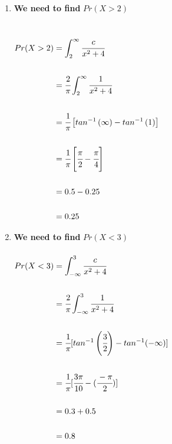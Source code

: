 \documentclass{article}
\begin{document}
\begin{enumerate}
\begin{enumerate}
\newpage
\item\large
\textbf{We need to find} $Pr(X > 2)$\\\\\\
$\begin{aligned}
Pr(X > 2) &= \int_{2}^{\infty} \cfrac{c}{x^2+4}\\\\
&= \cfrac{2}{\pi} \int_{2}^{\infty} \cfrac{1}{x^2+4}\\\\
&= \cfrac{1}{\pi} \left[  tan^{-1} \left( {\infty} \right) - tan^{-1} \left( {1} \right) \right]\\\\
&= \cfrac{1}{\pi} \left[ \cfrac{\pi}{2} - \cfrac{\pi}{4} \right]\\\\
&= 0.5 - 0.25\\\\\
&= 0.25
\end{aligned}$
\newpage
\item \large
\textbf{We need to find} $Pr(X < 3)$\\\\
$\begin{aligned}
Pr(X < 3) &= \int_{-\infty}^{3} \cfrac{c}{x^2+4}\\\\
&= \cfrac{2}{\pi} \int_{-\infty}^{3} \cfrac{1}{x^2+4}\\\\
&= \cfrac{1}{\pi} [  tan^{-1} \left( {\cfrac{3}{2}} \right) - tan^{-1} ( {-\infty} ) ]\\\\
&= \cfrac{1}{\pi} [ \cfrac{3\pi}{10} - (\cfrac{-\pi}{2}) ]\\\\
&= 0.3 + 0.5\\\\
&= 0.8
\end{aligned}$
\newpage


\end{enumerate}
\end{enumerate}
\end{document}
